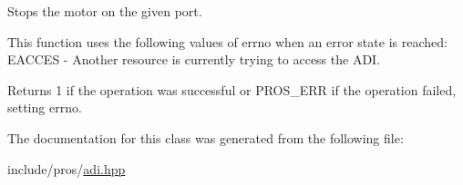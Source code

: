 Stops the motor on the given port. 

This function uses the following values of errno when an error state is reached\+: E\+A\+C\+C\+ES -\/ Another resource is currently trying to access the A\+DI.

\begin{DoxyReturn}{Returns}
1 if the operation was successful or P\+R\+O\+S\+\_\+\+E\+RR if the operation failed, setting errno. 
\end{DoxyReturn}


The documentation for this class was generated from the following file\+:\begin{DoxyCompactItemize}
\item 
include/pros/\mbox{\hyperlink{adi_8hpp}{adi.\+hpp}}\end{DoxyCompactItemize}
